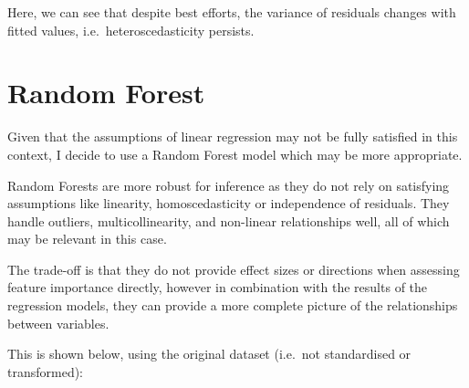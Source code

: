 \documentclass[
  number]{elsarticle}
\begin{document}
Here, we can see that despite best efforts, the variance of residuals
changes with fitted values, i.e.~heteroscedasticity persists.

\section{Random Forest}\label{sec-random-forest}

Given that the assumptions of linear regression may not be fully
satisfied in this context, I decide to use a Random Forest model which
may be more appropriate.

Random Forests are more robust for inference as they do not rely on
satisfying assumptions like linearity, homoscedasticity or independence
of residuals. They handle outliers, multicollinearity, and non-linear
relationships well, all of which may be relevant in this case.

The trade-off is that they do not provide effect sizes or directions
when assessing feature importance directly, however in combination with
the results of the regression models, they can provide a more complete
picture of the relationships between variables.

This is shown below, using the original dataset (i.e.~not standardised
or transformed):
\end{document}
